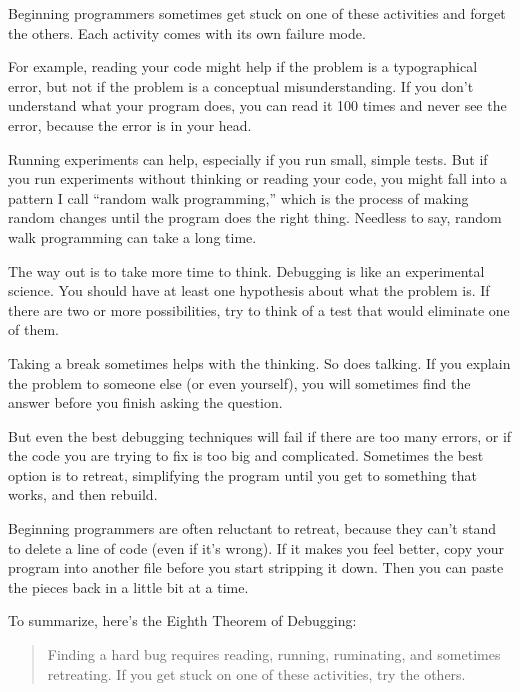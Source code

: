 Beginning programmers sometimes get stuck on one of these activities
and forget the others.  Each activity comes with its own failure
mode.

For example, reading your code might help if the problem is a
typographical error, but not if the problem is a conceptual
misunderstanding.  If you don't understand what your program does, you
can read it 100 times and never see the error, because the error is in
your head.

Running experiments can help, especially if you run small, simple
tests.  But if you run experiments without thinking or reading your
code, you might fall into a pattern I call ``random walk programming,''
which is the process of making random changes until the program
does the right thing.  Needless to say, random walk programming
can take a long time.


The way out is to take more time to think.  Debugging is like an
experimental science.  You should have at least one hypothesis about
what the problem is.  If there are two or more possibilities, try to
think of a test that would eliminate one of them.


Taking a break sometimes helps with the thinking.  So does talking.
If you explain the problem to someone else (or even yourself), you
will sometimes find the answer before you finish asking the question.

But even the best debugging techniques will fail if there are too many
errors, or if the code you are trying to fix is too big and
complicated.  Sometimes the best option is to retreat, simplifying the
program until you get to something that works, and then rebuild.

Beginning programmers are often reluctant to retreat, because
they can't stand to delete a line of code (even if it's wrong).
If it makes you feel better, copy your program into another file
before you start stripping it down.  Then you can paste the pieces
back in a little bit at a time.


To summarize, here's the Eighth Theorem of Debugging:

\begin{quote}
Finding a hard bug requires reading, running, ruminating,
and sometimes retreating.  If you get stuck on one of these
activities, try the others.
\end{quote}

